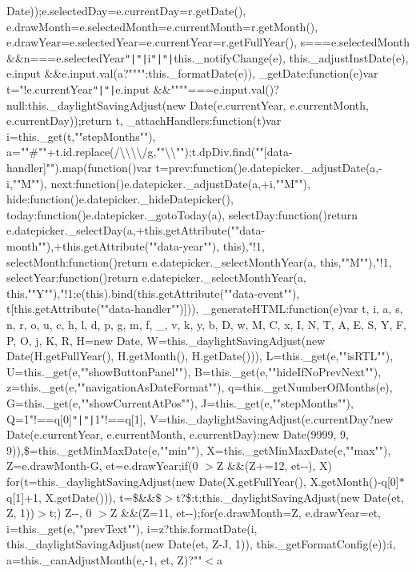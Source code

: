 Date));e.\+selected\+Day=e.\+current\+Day=r.\+get\+Date(), e.\+draw\+Month=e.\+selected\+Month=e.\+current\+Month=r.\+get\+Month(), e.\+draw\+Year=e.\+selected\+Year=e.\+current\+Year=r.\+get\+Full\+Year(), s===e.\+selected\+Month \&\&n===e.\+selected\+Year\texttt{"|}\texttt{"|}i\texttt{"|}\texttt{"|}this.\+\_\+notify\+Change(e), this.\+\_\+adjust\+Inst\+Date(e), e.\+input \&\&e.\+input.\+val(a?""""\+:this.\+\_\+format\+Date(e))\rcurly{}, \+\_\+get\+Date\+:function(e)\lcurly{}var t="!e.\+current\+Year\texttt{"|}\texttt{"|}e.\+input \&\&""""===e.\+input.\+val()?null\+:this.\+\_\+daylight\+Saving\+Adjust(new Date(e.\+current\+Year, e.\+current\+Month, e.\+current\+Day));return t\rcurly{}, \+\_\+attach\+Handlers\+:function(t)\lcurly{}var i=this.\+\_\+get(t,""step\+Months""), a=""\#""+t.\+id.\+replace(/\textbackslash{}\textbackslash{}\textbackslash{}\textbackslash{}/g,""\textbackslash{}\textbackslash{}"");t.\+dp\+Div.\+find(""[data-\/handler]"").\+map(function()\lcurly{}var t=\lcurly{}prev\+:function()\lcurly{}e.\+datepicker.\+\_\+adjust\+Date(a,-\/i,""M"")\rcurly{}, next\+:function()\lcurly{}e.\+datepicker.\+\_\+adjust\+Date(a,+i,""M"")\rcurly{}, hide\+:function()\lcurly{}e.\+datepicker.\+\_\+hide\+Datepicker()\rcurly{}, today\+:function()\lcurly{}e.\+datepicker.\+\_\+goto\+Today(a)\rcurly{}, select\+Day\+:function()\lcurly{}return e.\+datepicker.\+\_\+select\+Day(a,+this.\+get\+Attribute(""data-\/month""),+this.\+get\+Attribute(""data-\/year""), this),"!1\rcurly{}, select\+Month\+:function()\lcurly{}return e.\+datepicker.\+\_\+select\+Month\+Year(a, this,""M""),"!1\rcurly{}, select\+Year\+:function()\lcurly{}return e.\+datepicker.\+\_\+select\+Month\+Year(a, this,""Y""),"!1\rcurly{}\rcurly{};e(this).\+bind(this.\+get\+Attribute(""data-\/event""), t[this.\+get\+Attribute(""data-\/handler"")])\rcurly{})\rcurly{}, \+\_\+generate\+H\+T\+M\+L\+:function(e)\lcurly{}var t, i, a, s, n, r, o, u, c, h, l, d, p, g, m, f, \+\_\+, v, k, y, b, D, w, M, C, x, I, N, T, A, E, S, Y, F, P, O, j, K, R, H=new Date, W=this.\+\_\+daylight\+Saving\+Adjust(new Date(\+H.\+get\+Full\+Year(), H.\+get\+Month(), H.\+get\+Date())), L=this.\+\_\+get(e,""is\+R\+TL""), U=this.\+\_\+get(e,""show\+Button\+Panel""), B=this.\+\_\+get(e,""hide\+If\+No\+Prev\+Next""), z=this.\+\_\+get(e,""navigation\+As\+Date\+Format""), q=this.\+\_\+get\+Number\+Of\+Months(e), G=this.\+\_\+get(e,""show\+Current\+At\+Pos""), J=this.\+\_\+get(e,""step\+Months""), Q=1"!==q[0]\texttt{"|}\texttt{"|}1"!==q[1], V=this.\+\_\+daylight\+Saving\+Adjust(e.\+current\+Day?new Date(e.\+current\+Year, e.\+current\+Month, e.\+current\+Day)\+:new Date(9999, 9, 9)),\$=this.\+\_\+get\+Min\+Max\+Date(e,""min""), X=this.\+\_\+get\+Min\+Max\+Date(e,""max""), Z=e.\+draw\+Month-\/\+G, et=e.\+draw\+Year;if(0 $>$\+Z \&\&(\+Z+=12, et-\/-\/), X) for(t=this.\+\_\+daylight\+Saving\+Adjust(new Date(\+X.\+get\+Full\+Year(), X.\+get\+Month()-\/q[0]$\ast$q[1]+1, X.\+get\+Date())), t=\$\&\&\$$>$t?\$\+:t;this.\+\_\+daylight\+Saving\+Adjust(new Date(et, Z, 1))$>$t;) Z-\/-\/, 0 $>$\+Z \&\&(\+Z=11, et-\/-\/);for(e.\+draw\+Month=\+Z, e.\+draw\+Year=et, i=this.\+\_\+get(e,""prev\+Text""), i=z?this.\+format\+Date(i, this.\+\_\+daylight\+Saving\+Adjust(new Date(et, Z-\/\+J, 1)), this.\+\_\+get\+Format\+Config(e))\+:i, a=this.\+\_\+can\+Adjust\+Month(e,-\/1, et, Z)?""$<$a 